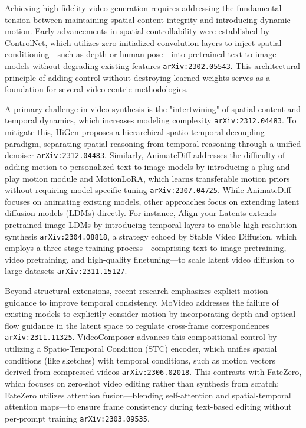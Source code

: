 \documentclass[11pt]{article}
\begin{document}
Achieving high-fidelity video generation requires addressing the fundamental tension between maintaining spatial content integrity and introducing dynamic motion. Early advancements in spatial controllability were established by ControlNet, which utilizes zero-initialized convolution layers to inject spatial conditioning—such as depth or human pose—into pretrained text-to-image models without degrading existing features \texttt{arXiv:2302.05543}. This architectural principle of adding control without destroying learned weights serves as a foundation for several video-centric methodologies.

A primary challenge in video synthesis is the "intertwining" of spatial content and temporal dynamics, which increases modeling complexity \texttt{arXiv:2312.04483}. To mitigate this, HiGen proposes a hierarchical spatio-temporal decoupling paradigm, separating spatial reasoning from temporal reasoning through a unified denoiser \texttt{arXiv:2312.04483}. Similarly, AnimateDiff addresses the difficulty of adding motion to personalized text-to-image models by introducing a plug-and-play motion module and MotionLoRA, which learns transferable motion priors without requiring model-specific tuning \texttt{arXiv:2307.04725}. While AnimateDiff focuses on animating existing models, other approaches focus on extending latent diffusion models (LDMs) directly. For instance, Align your Latents extends pretrained image LDMs by introducing temporal layers to enable high-resolution synthesis \texttt{arXiv:2304.08818}, a strategy echoed by Stable Video Diffusion, which employs a three-stage training process—comprising text-to-image pretraining, video pretraining, and high-quality finetuning—to scale latent video diffusion to large datasets \texttt{arXiv:2311.15127}.

Beyond structural extensions, recent research emphasizes explicit motion guidance to improve temporal consistency. MoVideo addresses the failure of existing models to explicitly consider motion by incorporating depth and optical flow guidance in the latent space to regulate cross-frame correspondences \texttt{arXiv:2311.11325}. VideoComposer advances this compositional control by utilizing a Spatio-Temporal Condition (STC) encoder, which unifies spatial conditions (like sketches) with temporal conditions, such as motion vectors derived from compressed videos \texttt{arXiv:2306.02018}. This contrasts with FateZero, which focuses on zero-shot video editing rather than synthesis from scratch; FateZero utilizes attention fusion—blending self-attention and spatial-temporal attention maps—to ensure frame consistency during text-based editing without per-prompt training \texttt{arXiv:2303.09535}.
\end{document}
